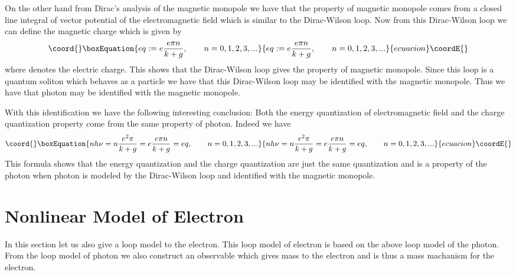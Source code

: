 \documentclass[a4paper,a4paper]{article}
\begin{document}
On the other hand from Dirac's analysis of the magnetic monopole \cite{Dir} we have that the property of magnetic monopole comes from a closed line integral of vector potential of the electromagnetic field which is similar to the Dirac-Wilson loop. Now from this Dirac-Wilson loop we can define the magnetic charge \coordHE{} which is given by
\begin{equation}\coord{}\boxEquation{ 
e q:= e\frac{e\pi n}{k+g}, \qquad n=0,1,2,3, . . .
\label{dirac}
}{ 
e q:= e\frac{e\pi n}{k+g}, \qquad n=0,1,2,3, . . .
}{ecuacion}\coordE{}\end{equation} 
where \coordHE{} denotes the electric charge. This shows that the Dirac-Wilson loop gives the property of magnetic monopole. Since this loop is a quantum soliton which behaves as a particle we have that this Dirac-Wilson loop may be identified with the magnetic monopole. Thus we have that photon may be identified with the magnetic monopole.

With this identification we have the following interesting conclusion: Both the energy quantization of electromagnetic field and the charge quantization property come from the same property of photon. Indeed we have
\begin{equation}\coord{}\boxEquation{ 
nh\nu=n\frac{e^2\pi}{k+g}=e\frac{e\pi n}{k+g}=eq, \qquad n=0,1,2,3, . . .
\label{dirac2}
}{ 
nh\nu=n\frac{e^2\pi}{k+g}=e\frac{e\pi n}{k+g}=eq, \qquad n=0,1,2,3, . . .
}{ecuacion}\coordE{}\end{equation}
This formula shows that the energy quantization and the charge quantization are just the same quantization and is a property of the photon when photon is modeled by the Dirac-Wilson loop and identified with the magnetic monopole.

\section{Nonlinear Model of Electron}

In this section let us also give a loop model to the electron. This loop model of electron is based on the above loop model of the photon. From the loop model of photon we also construct an observable which gives mass to the electron and is thus a mass machanism for the electron.
\end{document}
